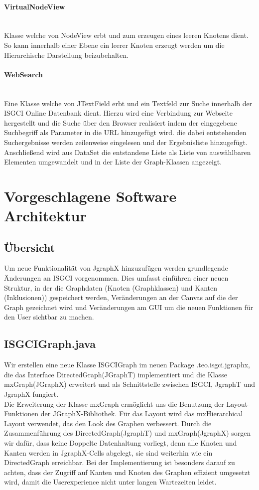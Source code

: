 \documentclass[10pt,a4paper]{article}
\begin{document}
\paragraph{VirtualNodeView}\ \\Klasse welche von NodeView erbt und zum erzeugen eines leeren Knotens dient. So kann innerhalb einer Ebene ein leerer Knoten erzeugt werden um die Hierarchische Darstellung beizubehalten.

\paragraph{WebSearch}\ \\Eine Klasse welche von JTextField erbt und ein Textfeld zur Suche innerhalb der ISGCI Online Datenbank dient. Hierzu wird eine Verbindung zur Webseite hergestellt und die Suche über den Browser realisiert indem der eingegebene Suchbegriff als Parameter in die URL hinzugefügt wird. die dabei entstehenden Suchergebnisse werden zeilenweise eingelesen und der Ergebnisliste hinzugefügt. Anschließend wird aus DataSet die entstandene Liste als Liste von auswählbaren Elementen umgewandelt und in der Liste der Graph-Klassen angezeigt. 


\newpage
\section{Vorgeschlagene Software Architektur}
\subsection{Übersicht}
Um neue Funktionalität von JgraphX hinzuzufügen werden grundlegende Änderungen an ISGCI vorgenommen. Dies umfasst einführen einer neuen Struktur, in der die Graphdaten (Knoten (Graphklassen) und Kanten (Inklusionen)) gespeichert werden, Veränderungen an der Canvas auf die der Graph gezeichnet wird und Veränderungen am GUI um die neuen Funktionen für den User sichtbar zu machen.
\subsection{ISGCIGraph.java}
Wir erstellen eine neue Klasse ISGCIGraph im neuen Package .teo.isgci.jgraphx, die das Interface DirectedGraph(JGraphT) implementiert und die Klasse mxGraph(JGraphX) erweitert und als Schnittstelle zwischen ISGCI, JgraphT und JgraphX fungiert.\\
Die Erweiterung der Klasse mxGraph ermöglicht uns die Benutzung der Layout-Funktionen der JGraphX-Bibliothek. Für das Layout wird das mxHierarchical Layout verwendet, das den Look des Graphen verbessert. 
 Durch die Zusammenführung des DirectedGraph(JgraphT) und mxGraph(JgraphX) sorgen wir dafür, dass keine Doppelte Datenhaltung vorliegt, denn alle Knoten und Kanten werden in JgraphX-Cells abgelegt, sie sind weiterhin wie ein DirectedGraph erreichbar. Bei der Implementierung ist besonders darauf zu achten, dass der Zugriff auf Kanten und Knoten des Graphen effizient umgesetzt wird, damit die Userexperience nicht unter langen Wartezeiten leidet.
\end{document}
